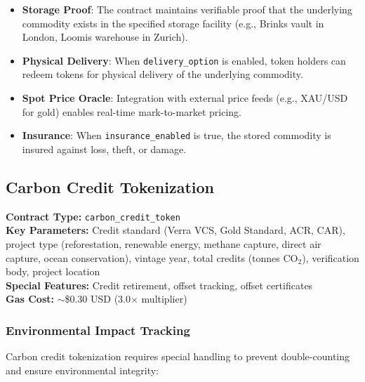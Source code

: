 \documentclass[11pt,a4paper,twoside]{article}
\begin{document}
\begin{itemize}
  \item \textbf{Storage Proof}: The contract maintains verifiable proof that the underlying commodity exists in the specified storage facility (e.g., Brinks vault in London, Loomis warehouse in Zurich).
  \item \textbf{Physical Delivery}: When \texttt{delivery\_option} is enabled, token holders can redeem tokens for physical delivery of the underlying commodity.
  \item \textbf{Spot Price Oracle}: Integration with external price feeds (e.g., XAU/USD for gold) enables real-time mark-to-market pricing.
  \item \textbf{Insurance}: When \texttt{insurance\_enabled} is true, the stored commodity is insured against loss, theft, or damage.
\end{itemize}

\subsection{Carbon Credit Tokenization}
\label{subsec:carbon}

\begin{keyinsight}
\textbf{Contract Type:} \texttt{carbon\_credit\_token}\\
\textbf{Key Parameters:} Credit standard (Verra VCS, Gold Standard, ACR, CAR), project type (reforestation, renewable energy, methane capture, direct air capture, ocean conservation), vintage year, total credits (tonnes CO$_2$), verification body, project location\\
\textbf{Special Features:} Credit retirement, offset tracking, offset certificates\\
\textbf{Gas Cost:} $\sim$\$0.30 USD (3.0$\times$ multiplier)
\end{keyinsight}

\subsubsection{Environmental Impact Tracking}

Carbon credit tokenization requires special handling to prevent double-counting and ensure environmental integrity:
\end{document}
